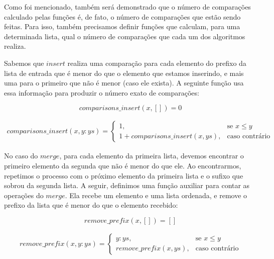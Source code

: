 \documentclass[12pt, oneside, a4paper,english,brazil]{abntex2}
\begin{document}
\qquad Como foi mencionado, tamb\'em ser\'a demonstrado que o n\'umero de compara\c{c}\~oes
calculado pelas fun\c{c}\~oes \'e, de fato, o n\'umero de compara\c{c}\~oes que est\~ao sendo feitas.
Para isso, tamb\'em precisamos definir fun\c{c}\~oes que calculam, para uma determinada lista,
qual o n\'umero de compara\c{c}\~oes que cada um dos algoritmos realiza.

\qquad Sabemos que $insert$ realiza uma compara\c{c}\~ao para cada elemento do prefixo da lista
de entrada que \'e menor do que o elemento que estamos inserindo, e mais uma para o primeiro
que n\~ao \'e menor (caso ele exista). A seguinte fun\c{c}\~ao usa essa informa\c{c}\~ao
para produzir o n\'umero exato de compara\c{c}\~oes:

\begin{equation} \label{comp_ins_base}
  comparisons\_insert(x, []) = 0
\end{equation}


\begin{equation} \label{comp_ins_ind}
\begin{split}
  comparisons\_insert(x, y : ys) =
    \begin{cases}
      1, &\text{se } x \le y \\
      1 + comparisons\_insert(x, ys), &\text{caso contr\'ario}
    \end{cases}
\end{split}
\end{equation}


\qquad No caso do $merge$, para cada elemento da primeira lista, devemos encontrar o primeiro
elemento da segunda que n\~ao \'e menor do que ele. Ao encontrarmos, repetimos o processo com o pr\'oximo
elemento da primeira lista e o sufixo que sobrou da segunda lista. A seguir, definimos uma
fun\c{c}\~ao auxiliar para contar as opera\c{c}\~oes do $merge$. Ela
recebe um elemento e uma lista ordenada, e remove o prefixo da lista que \'e menor do que o elemento
recebido:

\begin{equation} \label{rem_pref_base}
  remove\_prefix(x, []) = []
\end{equation}

\begin{equation} \label{rem_pref_ind}
\begin{split}
  remove\_prefix(x, y : ys) =
    \begin{cases}
      y : ys, &\text{se } x \le y \\
      remove\_prefix(x, ys), &\text{caso contr\'ario}
    \end{cases}
\end{split}
\end{equation}
\end{document}
